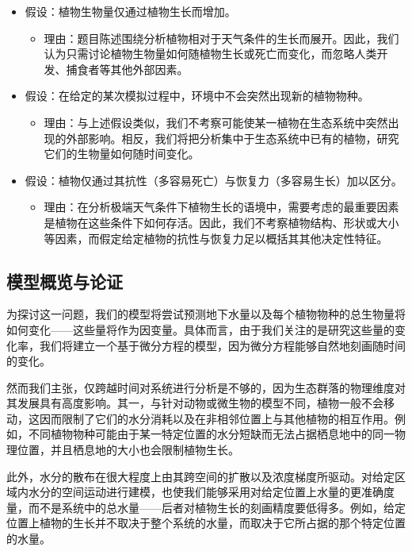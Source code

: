 \documentclass[11pt,a4paper]{ctexart}
\begin{document}
\begin{itemize}
\item 假设：植物生物量仅通过植物生长而增加。
  \begin{itemize}
  \item 理由：题目陈述围绕分析植物相对于天气条件的生长而展开。因此，我们认为只需讨论植物生物量如何随植物生长或死亡而变化，而忽略人类开发、捕食者等其他外部因素。
  \end{itemize}
\item 假设：在给定的某次模拟过程中，环境中不会突然出现新的植物物种。
  \begin{itemize}
  \item 理由：与上述假设类似，我们不考察可能使某一植物在生态系统中突然出现的外部影响。相反，我们将把分析集中于生态系统中已有的植物，研究它们的生物量如何随时间变化。
  \end{itemize}
\item 假设：植物仅通过其抗性（多容易死亡）与恢复力（多容易生长）加以区分。
  \begin{itemize}
  \item 理由：在分析极端天气条件下植物生长的语境中，需要考虑的最重要因素是植物在这些条件下如何存活。因此，我们不考察植物结构、形状或大小等因素，而假定给定植物的抗性与恢复力足以概括其其他决定性特征。
  \end{itemize}
\end{itemize}

\subsection{模型概览与论证}

为探讨这一问题，我们的模型将尝试预测地下水量以及每个植物物种的总生物量将如何变化——这些量将作为因变量。具体而言，由于我们关注的是研究这些量的变化率，我们将建立一个基于微分方程的模型，因为微分方程能够自然地刻画随时间的变化。

然而我们主张，仅跨越时间对系统进行分析是不够的，因为生态群落的物理维度对其发展具有高度影响。其一，与针对动物或微生物的模型不同，植物一般不会移动，这因而限制了它们的水分消耗以及在非相邻位置上与其他植物的相互作用。例如，不同植物物种可能由于某一特定位置的水分短缺而无法占据栖息地中的同一物理位置，并且栖息地的大小也会限制植物生长。

此外，水分的散布在很大程度上由其跨空间的扩散以及浓度梯度所驱动。对给定区域内水分的空间运动进行建模，也使我们能够采用对给定位置上水量的更准确度量，而不是系统中的总水量——后者对植物生长的刻画精度要低得多。例如，给定位置上植物的生长并不取决于整个系统的水量，而取决于它所占据的那个特定位置的水量。
\end{document}

